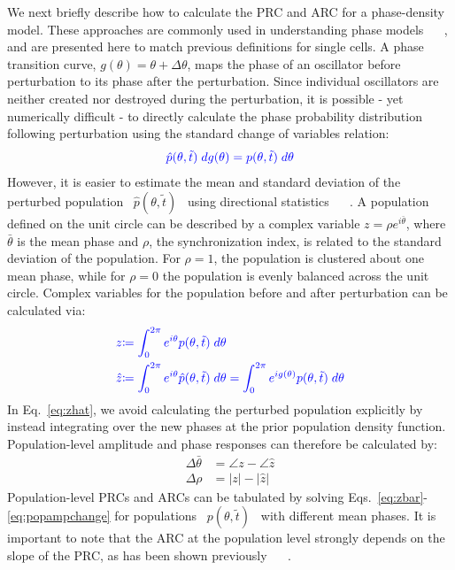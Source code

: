 \documentclass[11pt, letterpaper]{article}
\providecommand{\DIFadd}[1]{{\protect\color{blue}#1}} %
\providecommand{\DIFaddbegin}{} %
\providecommand{\DIFaddend}{} %
\begin{document}
\DIFaddbegin \DIFadd{We next briefly describe how to calculate the PRC and ARC for a phase-density model.
These approaches are commonly used in understanding phase models \mbox{%
\cite{Kuramoto1984, Ukai2007}
}%
, and are presented here to match previous definitions for single cells.
}\DIFaddend A phase transition curve, $g(\theta) = \theta + \Delta\theta$, maps the phase of an oscillator before perturbation to its phase after the perturbation.
Since individual oscillators are neither created nor destroyed during the perturbation, it is possible - yet numerically difficult - to directly calculate the phase probability distribution following perturbation using the \DIFaddbegin \DIFadd{standard change of variables relation:
}\begin{equation}\DIFadd{
  \hat{p}(\theta, \tilde{t})\; dg(\theta) = p(\theta, \tilde{t})\; d\theta
  \label{eq:pdfinversion}
}\end{equation}
\DIFaddend However, it is easier to estimate the mean and standard deviation of the perturbed population \DIFaddbegin \DIFadd{\mbox{%
$\hat{p}(\theta, \tilde{t})$
}%
using directional statistics \mbox{%
\cite{Mardia2009}
}%
.
}\DIFaddend A population defined on the unit circle can be described by a complex variable $z = \rho e^{i\bar{\theta}}$, where $\bar{\theta}$ is the mean phase and $\rho$, the synchronization index, is related to the standard deviation of the population.
For $\rho = 1$, the population is clustered about one mean phase, while for $\rho = 0$ the population is evenly balanced across the unit circle.
Complex variables for the population before and after perturbation can be calculated via:
\DIFaddbegin \begin{align}\DIFadd{
  z }&\DIFadd{\coloneqq \int_0^{2\pi} e^{i\theta} p(\theta, \tilde{t}) \; d\theta \label{eq:zbar}}\\
  \DIFadd{\hat{z} }&\DIFadd{\coloneqq  \int_0^{2\pi} e^{i\theta} \hat{p}(\theta, \tilde{t}) \; d\theta =
  \int_0^{2\pi} e^{i g(\theta)} p(\theta, \tilde{t}) \; d\theta
  \label{eq:zhat}
}\end{align}
\DIFaddend In Eq.~\ref{eq:zhat}, we avoid calculating the perturbed population explicitly by instead integrating over the new phases at the prior population density function.
Population-level amplitude and phase responses can therefore be calculated by:
\begin{align}
  \Delta \bar{\theta} &= \angle z - \angle \hat{z} \\
  \Delta \rho &= |z| - |\hat{z}|
  \label{eq:popampchange}
\end{align}
Population-level PRCs and ARCs can be tabulated by solving Eqs.\DIFaddbegin \DIFadd{~}\DIFaddend \ref{eq:zbar}-\ref{eq:popampchange} for populations \DIFaddbegin \DIFadd{\mbox{%
$p(\theta, \tilde{t})$
}%
}\DIFaddend with different mean phases.
\DIFaddbegin \DIFadd{It is important to note that the ARC at the population level strongly depends on the slope of the PRC, as has been shown previously \mbox{%
\cite{Ukai2007}
}%
.
}\DIFaddend 
\end{document}

